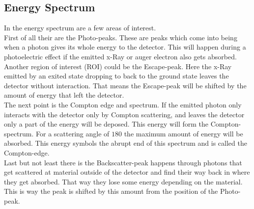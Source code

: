 \documentclass[30pt,a4paper]{article}
\begin{document}
 	\subsection{Energy Spectrum}
 	In the energy spectrum are a few areas of interest. \\
 	First of all their are the Photo-peaks. These are peaks which come into being when a photon gives its whole energy to the detector. This will happen during a photoelectric effect if the emitted x-Ray or auger electron also gets absorbed.\\
 	Another region of interest (ROI) could be the Escape-peak. Here the x-Ray emitted by an exited state dropping to back to the ground state leaves the detector without interaction. That means the Escape-peak will be shifted by the amount of energy that left the detector.\\
 	The next point is the Compton edge and spectrum. If the emitted photon only interacts with the detector only by Compton scattering, and leaves the detector only a part of the energy will be deposed. This energy will form the Compton-spectrum. For a scattering angle of $180$ the maximum amount of energy will be absorbed. This energy symbols the abrupt end of this spectrum and is called the Compton-edge.\\
 	Last but not least there is the Backscatter-peak happens through photons that get scattered at material outside of the detector and find their way back in where they get absorbed. That way they lose some energy depending on the material. This is way the peak is shifted by this amount from the position of the Photo-peak. 
\end{document}
